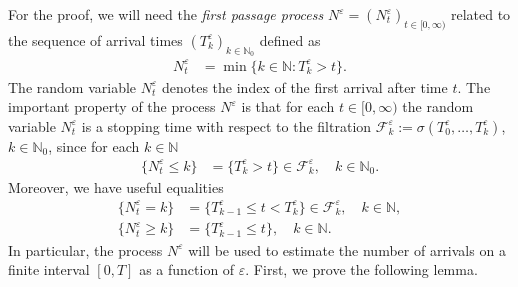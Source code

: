 \documentclass[10pt]{article}
\newcommand{\1}{1\!\!\!\;{\rm I}}
\theoremstyle{plain}
\theoremstyle{definition}
\newcommand{\e}{\varepsilon}
\newcommand{\ba}{\begin{equation}\begin{aligned}}
\newcommand{\ea}{\end{aligned}\end{equation}}
\newcommand{\rF}{\mathscr{F}}
\newcommand{\bN}{\mathbb{N}}
\numberwithin{equation}{section}
\begin{document}
For the proof, we will need the \emph{first passage process}
$N^\e=(N^\e_t)_{t\in[0,\infty)}$ related to the sequence of
arrival times $(T^\e_k)_{k\in\bN_0}$ defined as
\ba
N^\e_t&=\min\{k\in\mathbb N\colon T_k^\e> t\}.
\ea
The random variable $N^\e_t$ denotes the index of the first arrival after time $t$.
The important property of the process $N^\e$ is that for each $t\in[0,\infty)$
the random variable $N_t^\e$ is a stopping time with respect to the filtration
$\rF^\e_k:=\sigma(T_0^\e,\dots, T_k^\e)$, $k\in\mathbb N_0$,
since  for each $k\in\mathbb N$
\ba
\{N_t^\e \leq k\} & =\{T^\e_k > t \} \in \rF^\e_k,\quad k\in\mathbb N_0.
\ea
Moreover, we have useful equalities
\ba
\label{e:tnu}
\{N_t^\e=k\}& =\{T^\e_{k-1}\leq t< T^\e_k \}\in \rF^\e_k,\quad k\in\mathbb N,\\
\{N_t^\e\geq k\} & =\{T^\e_{k-1} \leq t \},\quad k\in\mathbb N.
\ea
In particular, the process $N^\e$ will be used to estimate the number of arrivals on a finite interval $[0,T]$ as a function of $\e$.
First, we prove the following lemma.
\end{document}
